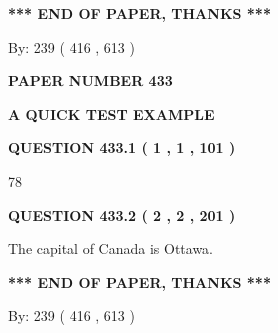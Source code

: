 \documentclass[12pt]{article}
\begin{document}
\vspace{1.0in} 
{\textbf{\large{ *** END OF PAPER, THANKS *** }}} 
   
   
\hspace{1.0in} By: 
 239 ( 416 ,  613 )
   
   
   
   
\newpage 
\setcounter{page}{ 
   433001 } 
   
   
   
   
 {\textbf{ \Large{ PAPER NUMBER  433  }}}
   
   
\vspace{0.2in}
   
   
   
   
   
   
 \vspace{0.2in}
{\LARGE {\textbf{ A QUICK TEST EXAMPLE}}}
   
   
  
\vspace{0.2in}
  
{\textbf{\Large{QUESTION
433.1 
 ( 1 , 1 , 101 )
}}}
  
  
 
 
\noindent{}

78
 
 
  
\vspace{0.2in}
  
{\textbf{\Large{QUESTION
433.2 
 ( 2 , 2 , 201 )
}}}
  
  
 
 
\noindent{}
 
 
The capital of Canada is Ottawa.
 
 
 
 
   
   
 \vspace{0.2in}
 
   
   
   
   
\vspace{1.0in} 
{\textbf{\large{ *** END OF PAPER, THANKS *** }}} 
   
   
\hspace{1.0in} By: 
 239 ( 416 ,  613 )
   
\end{document}
